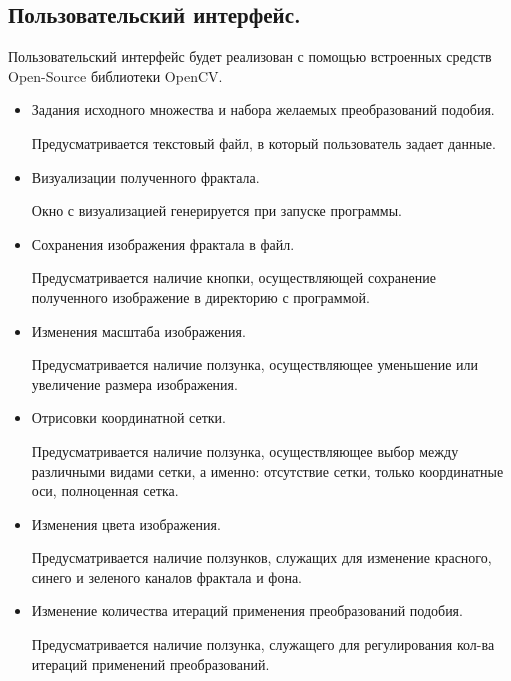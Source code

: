 \documentclass[a4paper,12pt,preview]{report} %
\begin{document}
	\subsection{Пользовательский интерфейс.}
		
		Пользовательский интерфейс будет реализован с помощью встроенных средств Open-Source библиотеки OpenCV.
		
		
		\begin{itemize}
			\item Задания исходного множества и набора желаемых преобразований подобия.
			
			Предусматривается текстовый файл, в который пользователь задает данные. \\
			
			\item Визуализации полученного фрактала.
			
			Окно с визуализацией генерируется при запуске программы. \\
			
			\item Сохранения изображения фрактала в файл.
			
			Предусматривается наличие кнопки, осуществляющей сохранение полученного изображение в директорию с программой. \\
			
			\item Изменения масштаба изображения.
			
			Предусматривается наличие ползунка, осуществляющее уменьшение или увеличение размера изображения. \\
			
			\item Отрисовки координатной сетки.
			
			Предусматривается наличие ползунка, осуществляющее выбор между различными видами сетки, а именно: отсутствие сетки, только координатные оси, полноценная сетка. \\
			
			\item Изменения цвета изображения.
			
			Предусматривается наличие ползунков, служащих для изменение красного, синего и зеленого каналов фрактала и фона. \\
			
			\item Изменение количества итераций применения преобразований подобия.
			
			Предусматривается наличие ползунка, служащего для регулирования кол-ва итераций применений преобразований.
			
			
		\end{itemize}
		
		
	



	
\end{document}
